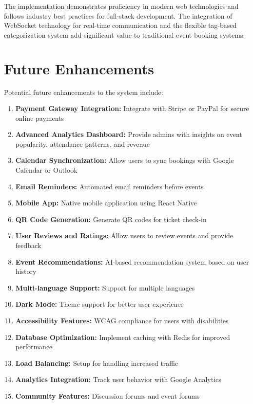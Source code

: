 \documentclass[12pt]{report}
\begin{document}
The implementation demonstrates proficiency in modern web technologies and follows industry best practices for full-stack development. The integration of WebSocket technology for real-time communication and the flexible tag-based categorization system add significant value to traditional event booking systems.

\section{Future Enhancements} 

Potential future enhancements to the system include:

\begin{enumerate}
\item \textbf{Payment Gateway Integration:} Integrate with Stripe or PayPal for secure online payments
\item \textbf{Advanced Analytics Dashboard:} Provide admins with insights on event popularity, attendance patterns, and revenue
\item \textbf{Calendar Synchronization:} Allow users to sync bookings with Google Calendar or Outlook
\item \textbf{Email Reminders:} Automated email reminders before events
\item \textbf{Mobile App:} Native mobile application using React Native
\item \textbf{QR Code Generation:} Generate QR codes for ticket check-in
\item \textbf{User Reviews and Ratings:} Allow users to review events and provide feedback
\item \textbf{Event Recommendations:} AI-based recommendation system based on user history
\item \textbf{Multi-language Support:} Support for multiple languages
\item \textbf{Dark Mode:} Theme support for better user experience
\item \textbf{Accessibility Features:} WCAG compliance for users with disabilities
\item \textbf{Database Optimization:} Implement caching with Redis for improved performance
\item \textbf{Load Balancing:} Setup for handling increased traffic
\item \textbf{Analytics Integration:} Track user behavior with Google Analytics
\item \textbf{Community Features:} Discussion forums and event forums
\end{enumerate}
\end{document}
